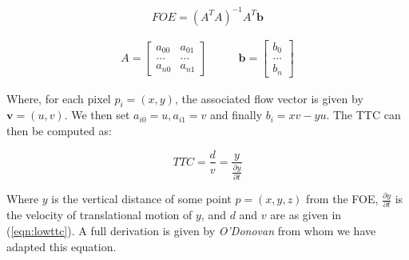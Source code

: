 \documentclass[a4paper,12pt]{article}
\begin{document}


\begin{equation}
  FOE = (A^TA)^{-1}A^T\mathbf{b}
\end{equation}

\begin{equation*}
  \begin{split}
 A = 
\begin{bmatrix}
  a_{00} & a_{01}\\
  \dots  & \dots \\
  a_{n0} &  a_{n1}
\end{bmatrix}
\qquad
\end{split}
\begin{split}
\mathbf{b} =
\begin{bmatrix}
  b_0 \\
  \dots \\
  b_n
\end{bmatrix}
\end{split}
\end{equation*}
\newline

Where, for each pixel $p_i = (x, y)$, the associated flow vector is given by $\mathbf{v} = (u, v)$.
We then set $a_{i0} = u, a_{i1} = v$ and finally $b_i = xv - yu$. The TTC can then be computed as:

\begin{equation}
  TTC = \frac{d}{v} = \frac{y}{\frac{\partial y}{\partial t}}
\end{equation}

Where $y$ is the vertical distance of some point $p = (x,y,z)$ from the
FOE, $\frac{\partial y}{\partial t}$ is the velocity of translational motion of $y$, and
$d$ and $v$ are as given in (\ref{eqn:lowttc}).
A full derivation is given by \textit{O'Donovan} from whom we have adapted this equation.
\newline
\end{document}

